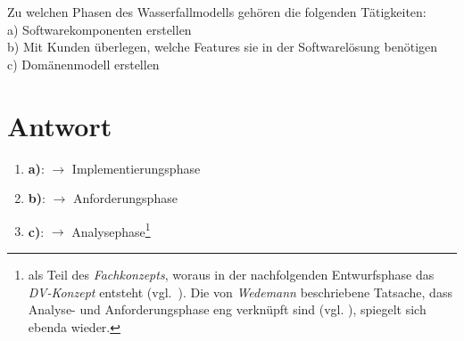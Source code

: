 Zu welchen Phasen des Wasserfallmodells gehören die folgenden Tätigkeiten:\\
\noindent
a) Softwarekomponenten erstellen\\
b) Mit Kunden überlegen, welche Features sie in der Softwarelösung benötigen\\
c) Domänenmodell erstellen\\


\section*{Antwort}

\begin{enumerate}
    \item \textbf{a)}: $\rightarrow$ Implementierungsphase
    \item \textbf{b)}: $\rightarrow$ Anforderungsphase
    \item \textbf{c)}: $\rightarrow$ Analysephase\footnote{
     als Teil des \textit{Fachkonzepts}, woraus in der nachfolgenden Entwurfsphase das \textit{DV-Konzept} entsteht (vgl.~\cite[318, Abbildung 14-3]{AABG14n}).
        Die von \textit{Wedemann} beschriebene Tatsache, dass Analyse- und Anforderungsphase eng verknüpft sind (vgl. \cite[18]{Wed09}), spiegelt sich ebenda wieder.
    }
\end{enumerate}